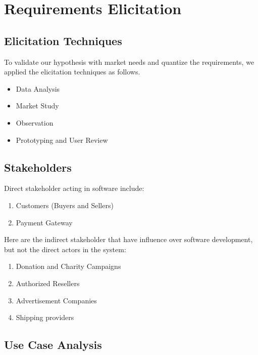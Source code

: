 %
%
\chapter{Requirements Elicitation}

\section{Elicitation Techniques}

To validate our hypothesis with market needs and quantize the requirements, we applied the elicitation techniques as follows.

\begin{itemize}
	\item Data Analysis
	\item Market Study
	\item Observation
	\item Prototyping and User Review
\end{itemize}

\section{Stakeholders}

Direct stakeholder acting in software include:

\begin{enumerate}
	\item Customers (Buyers and Sellers)
	\item Payment Gateway
\end{enumerate}

Here are the indirect stakeholder that have influence over software development, but not the direct actors in the system:

\begin{enumerate}
	\item Donation and Charity Campaigns
	\item Authorized Resellers
	\item Advertisement Companies
	\item Shipping providers
\end{enumerate}

\section{Use Case Analysis}

